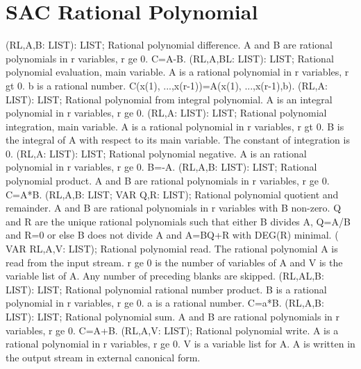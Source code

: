 \section{ SAC Rational Polynomial  } 
 (RL,A,B: LIST): LIST; \eproc
\bcom Rational polynomial difference. A and B are rational polynomials in
r variables, r ge 0. C=A-B. \ecom 
{} (RL,A,BL: LIST): LIST; \eproc
\bcom Rational polynomial evaluation, main variable. A is a rational
polynomial in r variables, r gt 0.  b is a rational number.
C(x(1), ...,x(r-1))=A(x(1), ...,x(r-1),b). \ecom 
{} (RL,A: LIST): LIST; \eproc
\bcom Rational polynomial from integral polynomial. A is an integral
polynomial in r variables, r ge 0. \ecom 
{} (RL,A: LIST): LIST; \eproc
\bcom Rational polynomial integration, main variable. A is a rational
polynomial in r variables, r gt 0.  B is the integral of A with
respect to its main variable. The constant of integration is 0. \ecom 
{} (RL,A: LIST): LIST; \eproc
\bcom Rational polynomial negative. A is an rational polynomial in r
variables, r ge 0. B=-A. \ecom 
{} (RL,A,B: LIST): LIST; \eproc
\bcom Rational polynomial product. A and B are rational polynomials in r
variables, r ge 0. C=A*B. \ecom 
{} (RL,A,B: LIST; VAR Q,R: LIST); \eproc
\bcom Rational polynomial quotient and remainder. A and B are rational
polynomials in r variables with B non-zero.  Q and R are the unique
rational polynomials such that either B divides A, Q=A/B and R=0 or
else B does not divide A and A=BQ+R with DEG(R) minimal. \ecom 
{} ( VAR RL,A,V: LIST); \eproc
\bcom Rational polynomial read. The rational polynomial A is read from the
input stream.  r ge 0 is the number of variables of A and V is the
variable list of A. Any number of preceding blanks are skipped. \ecom 
{} (RL,AL,B: LIST): LIST; \eproc
\bcom Rational polynomial rational number product. B is a rational
polynomial in r variables, r ge 0. a is a rational number. C=a*B. \ecom 
{} (RL,A,B: LIST): LIST; \eproc
\bcom Rational polynomial sum. A and B are rational polynomials in r
variables, r ge 0. C=A+B. \ecom 
{} (RL,A,V: LIST); \eproc
\bcom Rational polynomial write. A is a rational polynomial in r
variables, r ge 0.  V is a variable list for A.  A is written
in the output stream in external canonical form. \ecom 
